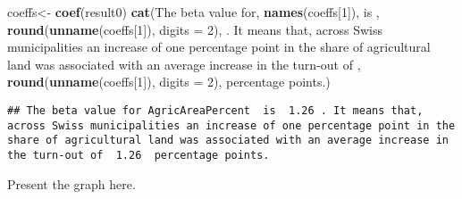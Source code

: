 \documentclass[
]{book}
\newenvironment{Shaded}{\begin{snugshade}}{\end{snugshade}}
\newcommand{\AttributeTok}[1]{\textcolor[rgb]{0.13,0.29,0.53}{#1}}
\newcommand{\CommentTok}[1]{\textcolor[rgb]{0.56,0.35,0.01}{\textit{#1}}}
\newcommand{\ConstantTok}[1]{\textcolor[rgb]{0.56,0.35,0.01}{#1}}
\newcommand{\DecValTok}[1]{\textcolor[rgb]{0.00,0.00,0.81}{#1}}
\newcommand{\FunctionTok}[1]{\textcolor[rgb]{0.13,0.29,0.53}{\textbf{#1}}}
\newcommand{\NormalTok}[1]{#1}
\newcommand{\OtherTok}[1]{\textcolor[rgb]{0.56,0.35,0.01}{#1}}
\newcommand{\SpecialCharTok}[1]{\textcolor[rgb]{0.81,0.36,0.00}{\textbf{#1}}}
\newcommand{\StringTok}[1]{\textcolor[rgb]{0.31,0.60,0.02}{#1}}
\begin{document}
\begin{Shaded}
\begin{Highlighting}[]
\NormalTok{coeffs}\OtherTok{\textless{}{-}} \FunctionTok{coef}\NormalTok{(result0)}
\FunctionTok{cat}\NormalTok{(}\StringTok{\textquotesingle{}The beta value for\textquotesingle{}}\NormalTok{, }\FunctionTok{names}\NormalTok{(coeffs[}\DecValTok{1}\NormalTok{]), }\StringTok{\textquotesingle{} is \textquotesingle{}}\NormalTok{, }\FunctionTok{round}\NormalTok{(}\FunctionTok{unname}\NormalTok{(coeffs[}\DecValTok{1}\NormalTok{]), }\AttributeTok{digits =} \DecValTok{2}\NormalTok{), }\StringTok{\textquotesingle{}. It means that, across Swiss municipalities an increase of one percentage point in the share of agricultural land was associated with an average increase in the turn{-}out of \textquotesingle{}}\NormalTok{, }\FunctionTok{round}\NormalTok{(}\FunctionTok{unname}\NormalTok{(coeffs[}\DecValTok{1}\NormalTok{]), }\AttributeTok{digits =} \DecValTok{2}\NormalTok{), }\StringTok{\textquotesingle{} percentage points.\textquotesingle{}}\NormalTok{)}
\end{Highlighting}
\end{Shaded}

\begin{verbatim}
## The beta value for AgricAreaPercent  is  1.26 . It means that, across Swiss municipalities an increase of one percentage point in the share of agricultural land was associated with an average increase in the turn-out of  1.26  percentage points.
\end{verbatim}

Present the graph here.

\begin{Shaded}
\end{Shaded}
\end{document}
